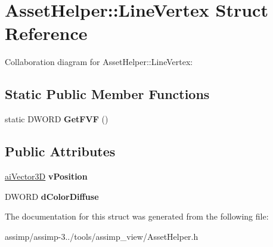 \hypertarget{struct_asset_helper_1_1_line_vertex}{\section{Asset\+Helper\+:\+:Line\+Vertex Struct Reference}
\label{struct_asset_helper_1_1_line_vertex}
}


Collaboration diagram for Asset\+Helper\+:\+:Line\+Vertex\+:
\subsection*{Static Public Member Functions}
\begin{DoxyCompactItemize}
\item 
\hypertarget{struct_asset_helper_1_1_line_vertex_a232d813c1a8dcafec6ddd40df20cf9d7}{static D\+W\+O\+R\+D {\bfseries Get\+F\+V\+F} ()}\label{struct_asset_helper_1_1_line_vertex_a232d813c1a8dcafec6ddd40df20cf9d7}

\end{DoxyCompactItemize}
\subsection*{Public Attributes}
\begin{DoxyCompactItemize}
\item 
\hypertarget{struct_asset_helper_1_1_line_vertex_ab4abcf0b34ac525e51f2b33713d34171}{\hyperlink{structai_vector3_d}{ai\+Vector3\+D} {\bfseries v\+Position}}\label{struct_asset_helper_1_1_line_vertex_ab4abcf0b34ac525e51f2b33713d34171}

\item 
\hypertarget{struct_asset_helper_1_1_line_vertex_ad6d0cefc3f70afaea875ff6272560a95}{D\+W\+O\+R\+D {\bfseries d\+Color\+Diffuse}}\label{struct_asset_helper_1_1_line_vertex_ad6d0cefc3f70afaea875ff6272560a95}

\end{DoxyCompactItemize}


The documentation for this struct was generated from the following file\+:\begin{DoxyCompactItemize}
\item 
assimp/assimp-\/3../tools/assimp\+\_\+view/Asset\+Helper.\+h\end{DoxyCompactItemize}
